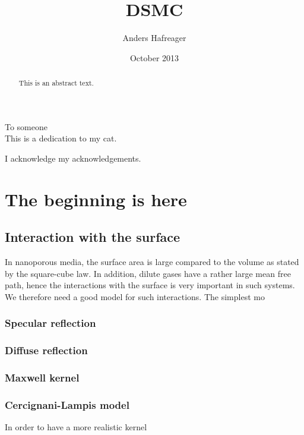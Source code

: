 \documentclass[twoside,english]{uiofysmaster}
\author{Anders Hafreager}
\title{\uppercase{DSMC}}
\date{October 2013}
\begin{document}
\maketitle

\begin{abstract}
This is an abstract text.
\end{abstract}

\begin{dedication}
  To someone
  \\\vspace{12pt}
  This is a dedication to my cat.
\end{dedication}

\begin{acknowledgements}
  I acknowledge my acknowledgements.
\end{acknowledgements}

\tableofcontents
\clearpage
\listoffigures
\clearpage
\listoftables

\chapter{The beginning is here}
\section{Interaction with the surface}
In nanoporous media, the surface area is large compared to the volume as stated by the square-cube law. In addition, dilute gases have a rather large mean free path, hence the interactions with the surface is very important in such systems. We therefore need a good model for such interactions. The simplest mo
\subsection{Specular reflection}
\subsection{Diffuse reflection}
\subsection{Maxwell kernel}
\subsection{Cercignani-Lampis model}
In order to have a more realistic kernel
\end{document}
